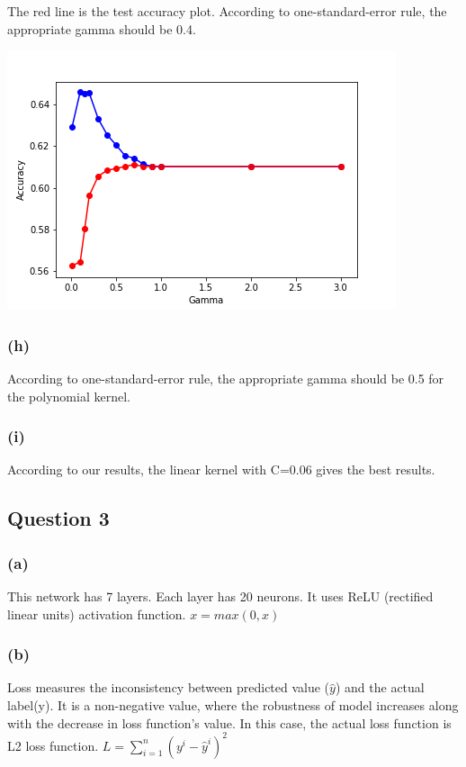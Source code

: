 \documentclass[12pt]{article}
\begin{document}
{The red line is the test accuracy plot. According to one-standard-error rule, the appropriate gamma should be 0.4. 
\begin{center}
\includegraphics[scale=0.8]{P2/cross_validation_rbf_gamma.png}
\end{center}

\subsubsection*{(h)}
According to one-standard-error rule, the appropriate gamma should be 0.5 for the polynomial kernel. 

\subsubsection*{(i)}
According to our results, the linear kernel with C=0.06 gives the best results. 

\subsection*{Question 3}
\subsubsection*{(a)}
This network has 7 layers. Each layer has 20 neurons. It uses ReLU (rectified linear units) activation function. $x = max(0, x)$

\subsubsection*{(b)}
Loss measures the inconsistency between predicted value ($\hat{y}$) and the actual label(y). It is a non-negative value, where the robustness of model increases along with the decrease in loss function's value. In this case, the actual loss function is L2 loss function. $L = \sum_{i=1}^n(y^i-\hat{y}^i)^2$

}
\end{document}
